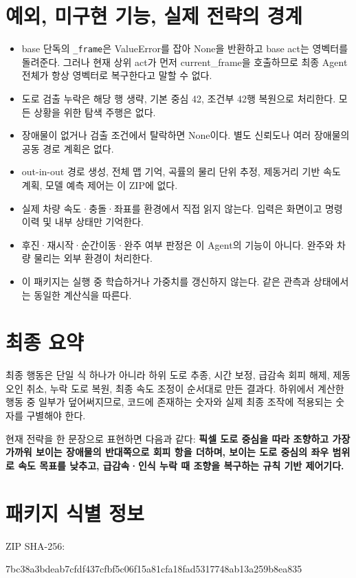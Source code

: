 \documentclass[11pt,a4paper]{article}
\newcommand{\code}[1]{{\small\nolinkurl{#1}}}
\begin{document}
\section{예외, 미구현 기능, 실제 전략의 경계}
\begin{itemize}
\item base 단독의 \code{_frame}은 ValueError를 잡아 None을 반환하고 base act는 영벡터를 돌려준다. 그러나 현재 상위 act가 먼저 current\_frame을 호출하므로 최종 Agent 전체가 항상 영벡터로 복구한다고 말할 수 없다.
\item 도로 검출 누락은 해당 행 생략, 기본 중심 42, 조건부 42행 복원으로 처리한다. 모든 상황을 위한 탐색 주행은 없다.
\item 장애물이 없거나 검출 조건에서 탈락하면 None이다. 별도 신뢰도나 여러 장애물의 공동 경로 계획은 없다.
\item out-in-out 경로 생성, 전체 맵 기억, 곡률의 물리 단위 추정, 제동거리 기반 속도 계획, 모델 예측 제어는 이 ZIP에 없다.
\item 실제 차량 속도·충돌·좌표를 환경에서 직접 읽지 않는다. 입력은 화면이고 명령 이력 및 내부 상태만 기억한다.
\item 후진·재시작·순간이동·완주 여부 판정은 이 Agent의 기능이 아니다. 완주와 차량 물리는 외부 환경이 처리한다.
\item 이 패키지는 실행 중 학습하거나 가중치를 갱신하지 않는다. 같은 관측과 상태에서는 동일한 계산식을 따른다.
\end{itemize}

\section{최종 요약}
최종 행동은 단일 식 하나가 아니라 하위 도로 추종, 시간 보정, 급감속 회피 해제, 제동 오인 취소, 누락 도로 복원, 최종 속도 조정이 순서대로 만든 결과다. 하위에서 계산한 행동 중 일부가 덮어써지므로, 코드에 존재하는 숫자와 실제 최종 조작에 적용되는 숫자를 구별해야 한다.

현재 전략을 한 문장으로 표현하면 다음과 같다: \textbf{픽셀 도로 중심을 따라 조향하고 가장 가까워 보이는 장애물의 반대쪽으로 회피 항을 더하며, 보이는 도로 중심의 좌우 범위로 속도 목표를 낮추고, 급감속·인식 누락 때 조향을 복구하는 규칙 기반 제어기다.}

\clearpage\appendix
\section{패키지 식별 정보}

ZIP SHA-256:\par
{\small\ttfamily 7bc38a3bdeab7cfdf437cfbf5c06f15a81cfa18fad5317748ab13a259b8ea835}
\end{document}
